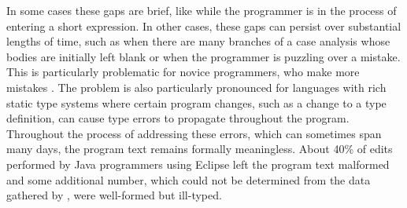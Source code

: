 In some cases these gaps are brief, like while the programmer
is in the process of entering  
a short expression. In other cases, these gaps can persist over substantial lengths of time, such as when there are many branches of a case analysis whose bodies are initially left blank or when the programmer is puzzling over a mistake.
%
This is particularly problematic for novice programmers, who make more mistakes \cite{mccauley2008debugging,fitzgerald2008debugging}.
%
The problem is also particularly pronounced for languages with rich static type systems where certain program changes, such as a change to a type definition, can cause type errors to propagate throughout the program. Throughout the process of addressing these errors, which can sometimes span many days, the program text remains formally meaningless. 
About 40\% of edits performed by Java programmers using Eclipse left the program text malformed \cite{popl-paper} and some additional number, which could not be determined from the data gathered by \citet{6883030}, were well-formed but ill-typed.




